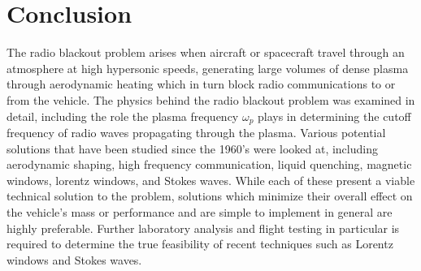\documentclass[twocolumn]{article}
\begin{document}
\section*{Conclusion}
	The radio blackout problem arises when aircraft or spacecraft travel through an atmosphere at high hypersonic speeds, generating large volumes of dense plasma through aerodynamic heating which in turn block radio communications to or from the vehicle.
	The physics behind the radio blackout problem was examined in detail, including the role the plasma frequency $\omega_p$ plays in determining the cutoff frequency of radio waves propagating through the plasma.
	Various potential solutions that have been studied since the 1960's were looked at, including aerodynamic shaping, high frequency communication, liquid quenching, magnetic windows, lorentz windows, and Stokes waves.
	While each of these present a viable technical solution to the problem, solutions which minimize their overall effect on the vehicle's mass or performance and are simple to implement in general are highly preferable.
	Further laboratory analysis and flight testing in particular is required to determine the true feasibility of recent techniques such as Lorentz windows and Stokes waves.


\end{document}
